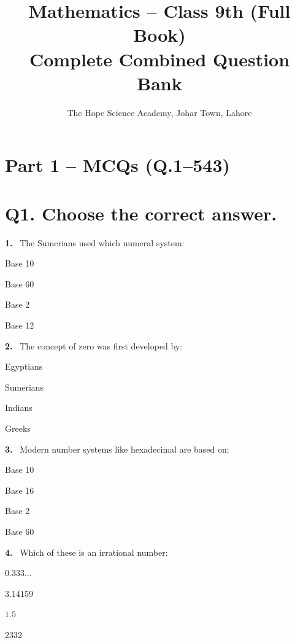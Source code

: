 \documentclass[11pt]{article}
\title{\textbf{Mathematics -- Class 9th (Full Book)\\Complete Combined Question Bank}}
\author{The Hope Science Academy, Johar Town, Lahore}
\date{}
\newenvironment{qenv}[1]{%
  \par\medskip\noindent\textbf{#1.}\ \ignorespaces
}{\par}
\begin{document}
\maketitle
\thispagestyle{fancy}
\tableofcontents
\clearpage

\section*{Part 1 -- MCQs (Q.1--543)}

\section*{Q1. Choose the correct answer.}

\begin{qenv}{1} The Sumerians used which numeral system:
\begin{options} \item Base 10 \item Base 60 \item Base 2 \item Base 12 \end{options} \end{qenv}

\begin{qenv}{2} The concept of zero was first developed by:
\begin{options} \item Egyptians \item Sumerians \item Indians \item Greeks \end{options} \end{qenv}

\begin{qenv}{3} Modern number systems like hexadecimal are based on:
\begin{options} \item Base 10 \item Base 16 \item Base 2 \item Base 60 \end{options} \end{qenv}

\begin{qenv}{4} Which of these is an irrational number:
\begin{options} \item $0.333\ldots$ \item $3.14159$ \item $1.5$ \item $2332$ \end{options} \end{qenv}
\end{document}
